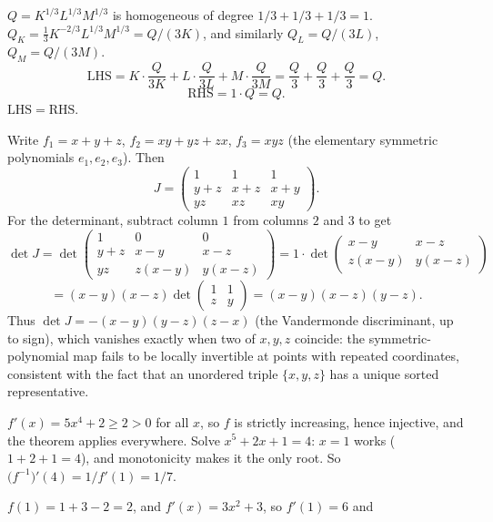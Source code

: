 \begin{solutions}
  \item $Q=K^{1/3}L^{1/3}M^{1/3}$ is homogeneous of degree
        $1/3+1/3+1/3=1$. $Q_{K}=\tfrac13K^{-2/3}L^{1/3}M^{1/3}=Q/(3K)$,
        and similarly $Q_{L}=Q/(3L)$, $Q_{M}=Q/(3M)$.
        \[
          \mathrm{LHS}=K\cdot\frac{Q}{3K}+L\cdot\frac{Q}{3L}
            +M\cdot\frac{Q}{3M}=\frac{Q}{3}+\frac{Q}{3}+\frac{Q}{3}=Q .
        \]
        \[
          \mathrm{RHS}=1\cdot Q=Q .
        \]
        $\mathrm{LHS}=\mathrm{RHS}$. \checkmark

  \item Write $f_{1}=x+y+z$, $f_{2}=xy+yz+zx$, $f_{3}=xyz$ (the
        elementary symmetric polynomials $e_{1},e_{2},e_{3}$). Then
        \[
          J=\begin{pmatrix}
            1 & 1 & 1\\
            y+z & x+z & x+y\\
            yz & xz & xy
          \end{pmatrix} .
        \]
        For the determinant, subtract column $1$ from columns $2$ and
        $3$ to get
        \[
          \det J = \det\begin{pmatrix}
            1 & 0 & 0\\
            y+z & x-y & x-z\\
            yz & z(x-y) & y(x-z)
          \end{pmatrix}
          = 1\cdot\det\begin{pmatrix}
            x-y & x-z\\ z(x-y) & y(x-z)
          \end{pmatrix}
        \]
        \[
          = (x-y)(x-z)\det\begin{pmatrix} 1 & 1\\ z & y\end{pmatrix}
          = (x-y)(x-z)(y-z) .
        \]
        Thus $\det J=-(x-y)(y-z)(z-x)$ (the Vandermonde discriminant, up
        to sign), which vanishes exactly when two of $x,y,z$ coincide:
        the symmetric-polynomial map fails to be locally invertible
        at points with repeated coordinates, consistent with the fact
        that an unordered triple $\{x,y,z\}$ has a unique sorted
        representative.
  \item $f'(x)=5x^{4}+2\ge2>0$ for all $x$, so $f$ is strictly increasing,
        hence injective, and the theorem applies everywhere. Solve
        $x^{5}+2x+1=4$: $x=1$ works ($1+2+1=4$), and monotonicity makes it
        the only root. So
        $\bigl(f^{-1}\bigr)'(4)=1/f'(1)=1/7$.
  \item $f(1)=1+3-2=2$, and $f'(x)=3x^{2}+3$, so $f'(1)=6$ and

\end{solutions}
